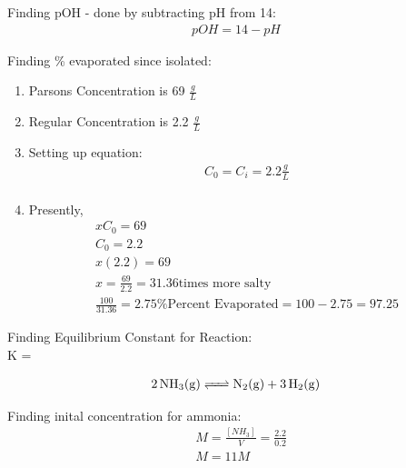 \documentclass{article}  %
\begin{document}
Finding pOH - done by subtracting pH from 14:
\begin{equation*}
    \begin{aligned}
        pOH = 14 - pH
    \end{aligned}
\end{equation*} 

Finding \% evaporated since isolated:
\begin{enumerate}
    \item Parsons Concentration is 69 $\frac{g}{L}$
    \item Regular Concentration is 2.2 $\frac{g}{L}$
    \item Setting up equation:
    \begin{equation*}
        \begin{aligned}
            C_0 = C_i = 2.2 \frac{g}{L} \\
        \end{aligned}
    \end{equation*}
    \item Presently, 
    \begin{equation*}
        \begin{aligned}
            xC_0 = 69 \\
            C_0 = 2.2 \\
            x(2.2) = 69 \\
            x = \frac{69}{2.2}  = 31.36 \text{times more salty}\\
            \frac{100}{31.36} = 2.75\% 
            \text{Percent Evaporated} = 100 - 2.75 = 97.25
        \end{aligned}
    \end{equation*}
\end{enumerate}

Finding Equilibrium Constant for Reaction: \\
K = 

\begin{equation*}
    \begin{aligned}
        \ce{2NH3_(g) <=> N2_(g) + 3H2_(g)}
    \end{aligned}
\end{equation*}

Finding inital concentration for ammonia:
\begin{equation*}
    \begin{aligned}
        &M = \frac{[NH_3]}{V} = \frac{2.2}{0.2} \\
        &M = 11M
    \end{aligned}
\end{equation*}
\end{document}

